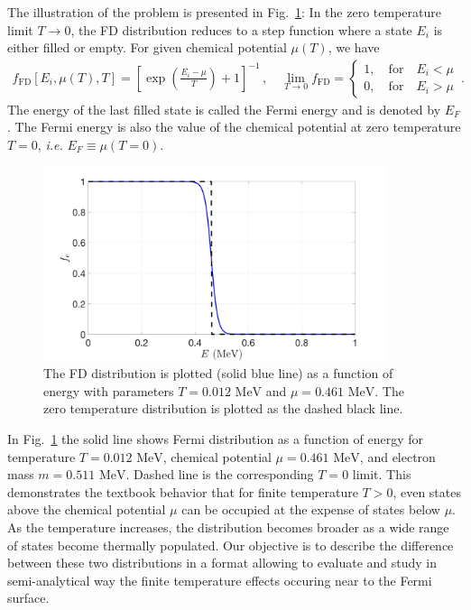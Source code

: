 \documentclass[sn-mathphys,Numbered]{sn-jnl}
\newcommand{\rf}[1]{Fig.~{\ref{#1}}}
\newcommand*{\MeV}{\text{ MeV}}
\begin{document}
The illustration of the problem is presented in \rf{Electron_001}: In the zero temperature limit $T\to0$, the FD distribution reduces to a step function where a state $E_{i}$ is either filled or empty. For given chemical potential $\mu(T)$, we have
\begin{align}
\label{f_old}
f_\mathrm{FD}[E_{i},\mu(T),T]=\left[\exp\left(\frac{E_{i}-\mu}{T}\right)+1\right]^{-1}\,,\quad
\lim_{T\to0}f_\mathrm{FD}=\left\{
\begin{array}{c}
1,\quad\mathrm{for}\quad{E_{i}}<\mu\\
0,\quad\mathrm{for}\quad{E_{i}}>\mu
\end{array}
\right.\,.
\end{align}
The energy of the last filled state is called the Fermi energy and is denoted by $E_F$. The Fermi energy is also the value of the chemical potential at zero temperature $T=0$, \emph{i.e.} $E_F\equiv\mu(T = 0)$.
\begin{figure}[ht]
\centering
\includegraphics[width=0.9\textwidth]{./plot/Electron_distribution001}
\caption{The FD distribution is plotted (solid blue line) as a function of energy with parameters $T=0.012\MeV$ and $\mu=0.461\MeV$. The zero temperature distribution is plotted as the dashed black line.}
\label{Electron_001}
\end{figure}

In \rf{Electron_001} the solid line shows Fermi distribution as a function of energy for temperature $T=0.012\MeV$, chemical potential $\mu=0.461\MeV$, and electron mass $m=0.511\MeV$. Dashed line is the corresponding $T=0$ limit.  This demonstrates the textbook behavior that for finite temperature $T > 0$, even states above the chemical potential $\mu$ can be occupied at the expense of states below $\mu$. As the temperature increases, the distribution becomes broader as a wide range of states become thermally populated. Our objective is to describe the difference between these two distributions in a format allowing to evaluate and study in semi-analytical way the finite temperature effects occuring near to the Fermi surface.
\end{document}
